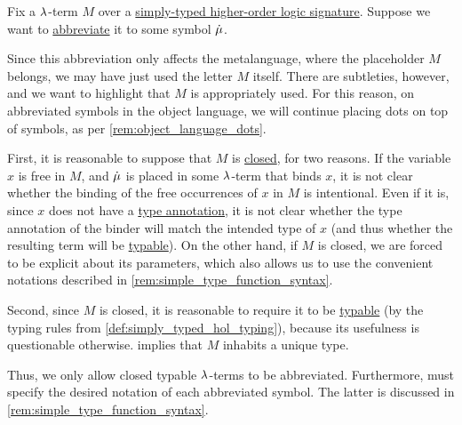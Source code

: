 \begin{remark}\label{rem:simply_typed_hol_abbreviations}
  Fix a \( {\mathrm \lambda} \)-term \( M \) over a \hyperref[def:simply_typed_hol_signature]{simply-typed higher-order logic signature}. Suppose we want to \hyperref[con:metalingual_abbreviation]{abbreviate} it to some symbol \( \dot{\mu} \).

  Since this abbreviation only affects the metalanguage, where the placeholder \( M \) belongs, we may have just used the letter \( M \) itself. There are subtleties, however, and we want to highlight that \( M \) is appropriately used. For this reason, on abbreviated symbols in the object language, we will continue placing dots on top of symbols, as per \cref{rem:object_language_dots}.

  First, it is reasonable to suppose that \( M \) is \hyperref[def:lambda_combinator]{closed}, for two reasons. If the variable \( x \) is free in \( M \), and \( \dot{\mu} \) is placed in some \( {\mathrm \lambda} \)-term that binds \( x \), it is not clear whether the binding of the free occurrences of \( x \) in \( M \) is intentional. Even if it is, since \( x \) does not have a \hyperref[con:type_annotation]{type annotation}, it is not clear whether the type annotation of the binder will match the intended type of \( x \) (and thus whether the resulting term will be \hyperref[def:typability]{typable}). On the other hand, if \( M \) is closed, we are forced to be explicit about its parameters, which also allows us to use the convenient notations described in \cref{rem:simple_type_function_syntax}.

  Second, since \( M \) is closed, it is reasonable to require it to be \hyperref[def:typability]{typable} (by the typing rules from \cref{def:simply_typed_hol_typing}), because its usefulness is questionable otherwise.  implies that \( M \) inhabits a unique type.

  Thus, we only allow closed typable \( {\mathrm \lambda} \)-terms to be abbreviated. Furthermore, must specify the desired notation of each abbreviated symbol. The latter is discussed in \cref{rem:simple_type_function_syntax}.
\end{remark}

